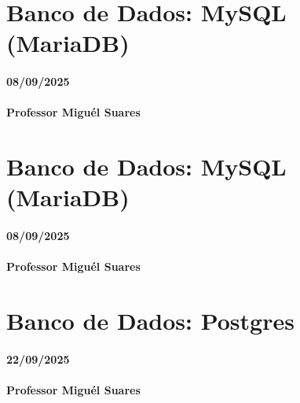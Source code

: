 \documentclass[
]{book}
\begin{document}
\chapter{Banco de Dados: MySQL (MariaDB)}\label{banco-de-dados-mysql-mariadb}

\subsubsection*{08/09/2025}\label{section-7}

\subsubsection*{Professor Miguél Suares}\label{professor-miguuxe9l-suares-7}

\chapter{Banco de Dados: MySQL (MariaDB)}\label{banco-de-dados-mysql-mariadb-1}

\subsubsection*{08/09/2025}\label{section-8}

\subsubsection*{Professor Miguél Suares}\label{professor-miguuxe9l-suares-8}

\chapter{Banco de Dados: Postgres}\label{banco-de-dados-postgres}

\subsubsection*{22/09/2025}\label{section-9}

\subsubsection*{Professor Miguél Suares}\label{professor-miguuxe9l-suares-9}
\end{document}
